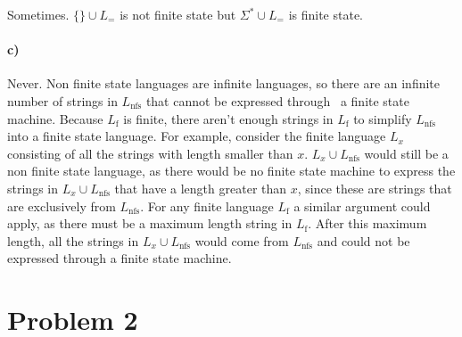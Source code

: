 \documentclass[12pt]{article}
\begin{document}
Sometimes. \(\{\} \cup L_=\) is not finite state but \(\Sigma^* \cup L_=\) is finite state.

\paragraph{c)}

Never. Non finite state languages are infinite languages, so there are an infinite number of strings in \(L_\text{nfs}\) that cannot be expressed through \
a finite state machine. Because \(L_\text{f}\) is finite, there aren't enough strings in \(L_\text{f}\) to simplify \(L_\text{nfs}\) into a finite state language.
For example, consider the finite language \(L_x\) consisting of all the strings with length smaller than \(x\).
\(L_x \cup L_\text{nfs}\) would still be a non finite state language, as there would be no finite state machine to express the strings in \(L_x \cup L_\text{nfs}\)
that have a length greater than \(x\), since these are strings
that are exclusively from \(L_\text{nfs}\). For any finite language \(L_\text{f}\) a similar argument could apply, as there must be a maximum length string in
\(L_\text{f}\). After this maximum length, all the strings in \(L_x \cup L_\text{nfs}\) would come from \(L_\text{nfs}\) and could not be expressed through a
finite state machine.

\section{Problem 2}
\end{document}
